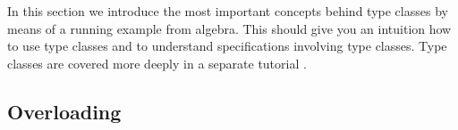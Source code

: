 In this section we introduce the most important concepts behind type
classes by means of a running example from algebra.  This should give
you an intuition how to use type classes and to understand
specifications involving type classes.  Type classes are covered more
deeply in a separate tutorial \cite{isabelle-classes}.

\subsection{Overloading}
\label{sec:overloading}








